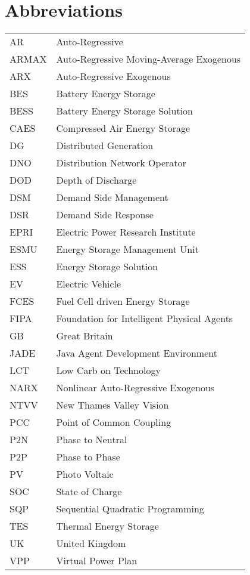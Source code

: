 \chapter*{Abbreviations}


\begin{table*}[hbt]
  \begin{tabular}{l l}
    AR & Auto-Regressive\\
    ARMAX & Auto-Regressive Moving-Average Exogenous\\
    ARX & Auto-Regressive Exogenous\\
    BES & Battery Energy Storage\\
    BESS & Battery Energy Storage Solution\\
    CAES & Compressed Air Energy Storage\\
    DG & Distributed Generation\\
    DNO & Distribution Network Operator\\
    DOD & Depth of Discharge\\
    DSM & Demand Side Management\\
    DSR & Demand Side Response\\
    EPRI & Electric Power Research Institute\\
    ESMU & Energy Storage Management Unit\\
    ESS & Energy Storage Solution\\
    EV & Electric Vehicle\\
    FCES & Fuel Cell driven Energy Storage\\
    FIPA & Foundation for Intelligent Physical Agents\\
    GB & Great Britain\\
    JADE & Java Agent Development Environment\\
    LCT & Low Carb on Technology\\
    NARX & Nonlinear Auto-Regressive Exogenous\\
    NTVV & New Thames Valley Vision\\
    PCC & Point of Common Coupling\\
    P2N & Phase to Neutral\\
    P2P & Phase to Phase\\
    PV & Photo Voltaic\\
    SOC & State of Charge\\
    SQP & Sequential Quadratic Programming\\
    TES & Thermal Energy Storage\\
    UK & United Kingdom\\
    VPP & Virtual Power Plan
  \end{tabular}
\end{table*}
